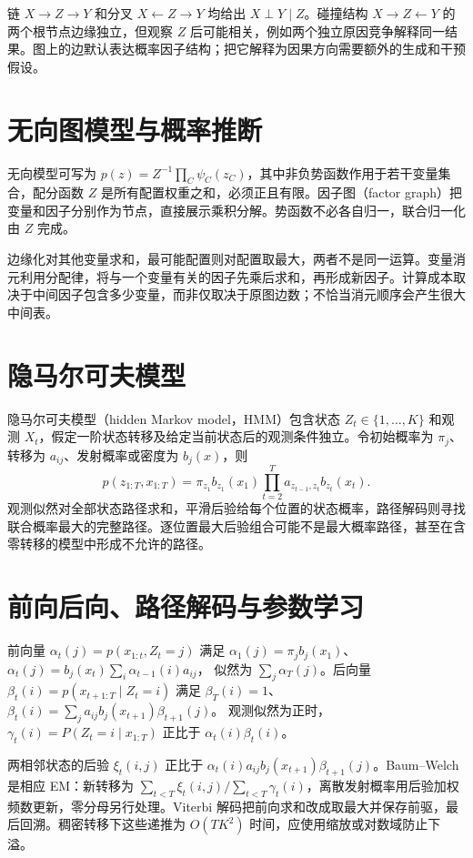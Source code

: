 \documentclass[UTF8,12pt,a4paper,fontset=fandol]{ctexbook}
\begin{document}
链 $X\to Z\to Y$ 和分叉 $X\leftarrow Z\to Y$ 均给出 $X\perp Y\mid Z$。碰撞结构 $X\to Z\leftarrow Y$ 的两个根节点边缘独立，但观察 $Z$ 后可能相关，例如两个独立原因竞争解释同一结果。图上的边默认表达概率因子结构；把它解释为因果方向需要额外的生成和干预假设。

\section{无向图模型与概率推断}

无向模型可写为 $p(z)=Z^{-1}\prod_C\psi_C(z_C)$，其中非负势函数作用于若干变量集合，配分函数 $Z$ 是所有配置权重之和，必须正且有限。因子图（factor graph）把变量和因子分别作为节点，直接展示乘积分解。势函数不必各自归一，联合归一化由 $Z$ 完成。

边缘化对其他变量求和，最可能配置则对配置取最大，两者不是同一运算。变量消元利用分配律，将与一个变量有关的因子先乘后求和，再形成新因子。计算成本取决于中间因子包含多少变量，而非仅取决于原图边数；不恰当消元顺序会产生很大中间表。

\section{隐马尔可夫模型}

隐马尔可夫模型（hidden Markov model，HMM）包含状态 $Z_t\in\{1,\ldots,K\}$ 和观测 $X_t$，假定一阶状态转移及给定当前状态后的观测条件独立。令初始概率为 $\pi_j$、转移为 $a_{ij}$、发射概率或密度为 $b_j(x)$，则
\begin{equation}
 p(z_{1:T},x_{1:T})=\pi_{z_1}b_{z_1}(x_1)
 \prod_{t=2}^Ta_{z_{t-1},z_t}b_{z_t}(x_t).
 \label{eq:ml-hmm-joint}
\end{equation}
观测似然对全部状态路径求和，平滑后验给每个位置的状态概率，路径解码则寻找联合概率最大的完整路径。逐位置最大后验组合可能不是最大概率路径，甚至在含零转移的模型中形成不允许的路径。

\section{前向后向、路径解码与参数学习}

前向量 $\alpha_t(j)=p(x_{1:t},Z_t=j)$ 满足
$\alpha_1(j)=\pi_jb_j(x_1)$、
$\alpha_t(j)=b_j(x_t)\sum_i\alpha_{t-1}(i)a_{ij}$，
似然为 $\sum_j\alpha_T(j)$。后向量 $\beta_t(i)=p(x_{t+1:T}\mid Z_t=i)$ 满足
$\beta_T(i)=1$、
$\beta_t(i)=\sum_ja_{ij}b_j(x_{t+1})\beta_{t+1}(j)$。
观测似然为正时，$\gamma_t(i)=P(Z_t=i\mid x_{1:T})$ 正比于 $\alpha_t(i)\beta_t(i)$。

两相邻状态的后验 $\xi_t(i,j)$ 正比于 $\alpha_t(i)a_{ij}b_j(x_{t+1})\beta_{t+1}(j)$。Baum--Welch 是相应 EM：新转移为 $\sum_{t<T}\xi_t(i,j)/\sum_{t<T}\gamma_t(i)$，离散发射概率用后验加权频数更新，零分母另行处理。Viterbi 解码把前向求和改成取最大并保存前驱，最后回溯。稠密转移下这些递推为 $O(TK^2)$ 时间，应使用缩放或对数域防止下溢。
\end{document}
